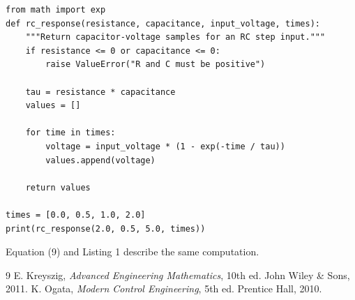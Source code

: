 \documentclass[10pt]{article}
\begin{document}
\begin{lstlisting}[caption={Computing samples of the RC step response.}, label={lst:python}]
from math import exp
def rc_response(resistance, capacitance, input_voltage, times):
    """Return capacitor-voltage samples for an RC step input."""
    if resistance <= 0 or capacitance <= 0:
        raise ValueError("R and C must be positive")
    
    tau = resistance * capacitance
    values = []
    
    for time in times:
        voltage = input_voltage * (1 - exp(-time / tau))
        values.append(voltage)
        
    return values

times = [0.0, 0.5, 1.0, 2.0]
print(rc_response(2.0, 0.5, 5.0, times))
\end{lstlisting}

Equation (9) and Listing 1 describe the same computation.

\begin{thebibliography}{9}
E. Kreyszig, \textit{Advanced Engineering Mathematics}, 10th ed. John Wiley \& Sons, 2011.
K. Ogata, \textit{Modern Control Engineering}, 5th ed. Prentice Hall, 2010.
\end{thebibliography}
\end{document}
